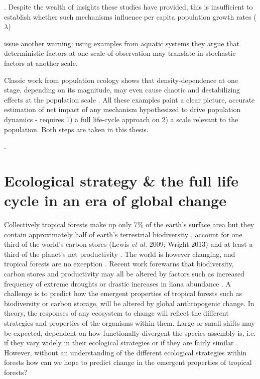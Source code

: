 \documentclass[b5paper,justified]{tufte-book} %
\begin{document}
\citep{Harms2000, Comita2010, Mangan2010, Johnson2012, Bagchi2014}. Despite the wealth of insights these studies have provided, this is insufficient to establish whether such mechanisms influence per capita population growth rates ($\lambda$) 

\citet{DeKroon2016} issue another warning: using examples from aquatic systems they argue that deterministic factors at one scale of observation may translate in stochastic factors at another scale. \begin{fullwidth} Classic work from population ecology shows that density-dependence at one stage, depending on its magnitude, may even cause chaotic and destabilizing effects at the population scale \citep{May1976, Hassell1986}.  All these examples paint a clear picture, accurate estimation of net impact of any mechanism hypothesized to drive population dynamics - requires 1) a full life-cycle approach on 2) a scale relevant to the population. Both steps are taken in this thesis. 
\end{fullwidth}.  

\section{Ecological strategy \& the full life cycle in an era of global change}
Collectively tropical forests make up only 7\% of the earth's surface area but they contain approximately half of earth's terrestrial biodiversity \citep{May1992, MEA2005}, account for one third of the world's carbon stores (Lewis \emph{et al.} 2009; Wright 2013) and at least a third of the planet's net productivity \citep{Field1998, Roy2001}. The world is however changing, and tropical forests are no exception \citep{Malhi2014}. Recent work forewarns that biodiversity, carbon stores and productivity may all be altered by factors such as increased frequency of extreme droughts \citep{Bennett2015} or drastic increases in liana abundance \citep{Phillips2002, Schnitzer2011}. A challenge is to predict how the emergent properties of tropical forests such as biodiversity or carbon storage, will be altered by global anthropogenic change. In theory, the responses of any ecosystem to change will reflect the different strategies and properties of the organisms within them.  Large or small shifts may be expected, dependent on how functionally divergent the species assembly is, i.e. if they vary widely in their ecological strategies or if they are fairly similar \citep{Fonseca2001}.  However, without an understanding of the different ecological strategies within forests how can we hope to predict change in the emergent properties of tropical forests? 
\end{document}
